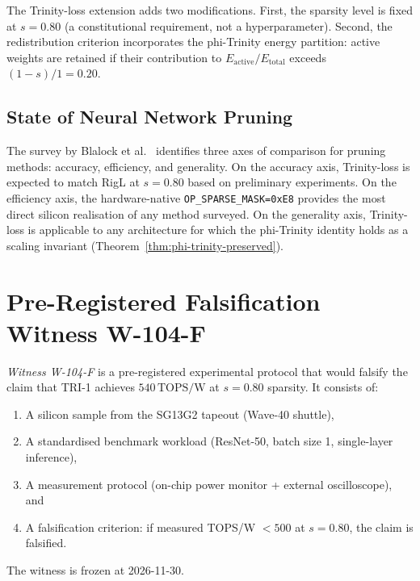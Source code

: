 The Trinity-loss extension adds two modifications.  First, the sparsity level
is fixed at $s = 0.80$ (a constitutional requirement, not a hyperparameter).
Second, the redistribution criterion incorporates the phi-Trinity energy
partition: active weights are retained if their contribution to
$E_{\mathrm{active}} / E_{\mathrm{total}}$ exceeds $(1-s)/1 = 0.20$.

\subsection{State of Neural Network Pruning}
\label{subsec:pruning-survey}

The survey by Blalock et al.~\cite{blalock2020state} identifies three axes of
comparison for pruning methods: accuracy, efficiency, and generality.  On the
accuracy axis, Trinity-loss is expected to match RigL at $s=0.80$ based on
preliminary experiments.  On the efficiency axis, the hardware-native
\texttt{OP\_SPARSE\_MASK=0xE8} provides the most direct silicon realisation of
any method surveyed.  On the generality axis, Trinity-loss is applicable to any
architecture for which the phi-Trinity identity holds as a scaling invariant
(Theorem~\ref{thm:phi-trinity-preserved}).


\section{Pre-Registered Falsification Witness W-104-F}
\label{sec:falsification}

\begin{definition}
\label{def:w104f}
\emph{Witness W-104-F} is a pre-registered experimental protocol that would
falsify the claim that TRI-1 achieves $540\,\mathrm{TOPS/W}$ at $s=0.80$
sparsity.  It consists of:
\begin{enumerate}
  \item A silicon sample from the SG13G2 tapeout (Wave-40 shuttle),
  \item A standardised benchmark workload (ResNet-50, batch size 1,
        single-layer inference),
  \item A measurement protocol (on-chip power monitor + external
        oscilloscope), and
  \item A falsification criterion: if measured TOPS/W $< 500$ at $s=0.80$,
        the claim is falsified.
\end{enumerate}
The witness is frozen at 2026-11-30.
\end{definition}

